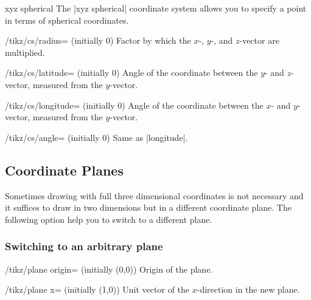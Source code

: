 \begin{coordinatesystem}{xyz spherical}
  The |xyz spherical| coordinate system allows you to specify a point
  in terms of spherical coordinates.
  \begin{key}{/tikz/cs/radius= (initially 0)}
    Factor by which the $x$-, $y$-, and $z$-vector are multiplied.
  \end{key}
  \begin{key}{/tikz/cs/latitude= (initially 0)}
    Angle of the coordinate between the $y$- and $z$-vector, measured
    from the $y$-vector.
  \end{key}
  \begin{key}{/tikz/cs/longitude= (initially 0)}
    Angle of the coordinate between the $x$- and $y$-vector, measured
    from the $y$-vector.
  \end{key}
  \begin{key}{/tikz/cs/angle= (initially 0)}
    Same as |longitude|.
  \end{key}
\begin{codeexample}[]
\end{codeexample}
\end{coordinatesystem}

\subsection{Coordinate Planes}

Sometimes drawing with full three dimensional coordinates is not
necessary and it suffices to draw in two dimensions but in a different
coordinate plane.  The following option help you to switch to a
different plane.

\subsubsection{Switching to an arbitrary plane}

\begin{key}{/tikz/plane origin= (initially {(0,0)})}
  Origin of the plane.
\end{key}

\begin{key}{/tikz/plane x= (initially {(1,0)})}
  Unit vector of the $x$-direction in the new plane.
\end{key}

